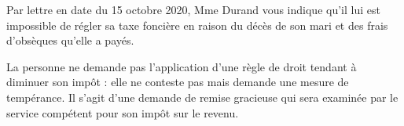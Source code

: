 \documentclass[a4paper, 12pt]{exam}
\begin{document}
\begin{questions}
	
	\question Par lettre en date du 15 octobre 2020, Mme Durand vous indique qu'il lui est impossible de régler sa taxe foncière en raison du décès de son mari et des frais d'obsèques qu'elle a payés.
	\begin{solution}
		La personne ne demande pas l'application d'une règle de droit tendant à diminuer son impôt : elle ne conteste pas mais demande une mesure de tempérance. Il s'agit d'une demande de remise gracieuse qui sera examinée par le service compétent pour son impôt sur le revenu.
	\end{solution}
	

\end{questions}
\end{document}
